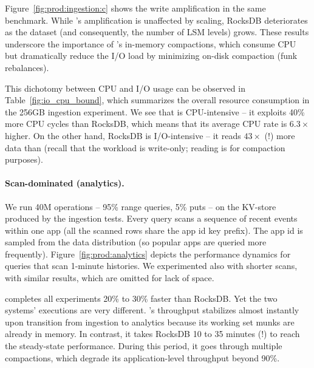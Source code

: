 Figure~\ref{fig:prod:ingestion:c} shows the write amplification in the same benchmark. 
While \sys's amplification is unaffected by  scaling, RocksDB deteriorates as the dataset (and consequently, the number of LSM levels) grows. 
These results underscore the importance of \sys's in-memory compactions, which consume CPU 
but dramatically reduce the I/O load by minimizing on-disk compaction (funk rebalances). 

This dichotomy between CPU and I/O usage can be observed in 
Table~\ref{fig:io_cpu_bound}, which summarizes  the overall resource consumption in the  256GB ingestion
experiment. We see that \sys\/ is CPU-intensive -- it exploits 40\% more CPU cycles than RocksDB, which means that its average CPU rate is $6.3\times$ higher. 
On the other hand, RocksDB is I/O-intensive -- it reads $43\times$ (!) more data than \sys\/ (recall that the workload is write-only; reading is for compaction purposes). 


\paragraph{Scan-dominated (analytics).} We run 40M operations -- 95\% range queries, 5\% puts -- 
on the KV-store produced by the ingestion tests.
Every query scans a sequence of recent events within one app (all the scanned rows 
share the  app id key prefix).  
The app id is sampled from the data distribution (so popular apps are queried more frequently).  
Figure~\ref{fig:prod:analytics} depicts the performance dynamics for queries that scan 1-minute histories.
We experimented also with shorter scans, with similar results, which are omitted for lack of space.

\sys\/ completes all experiments 20\% to 30\% faster than RocksDB. 
Yet the two systems' executions are very different. \sys's throughput stabilizes 
almost instantly upon transition from ingestion to analytics because its working set munks are already 
in memory. In contrast, it takes RocksDB 10 to 35 minutes (!) to reach the steady-state performance. 
During this period, it goes through multiple compactions, which degrade its application-level throughput 
beyond 90\%. 

